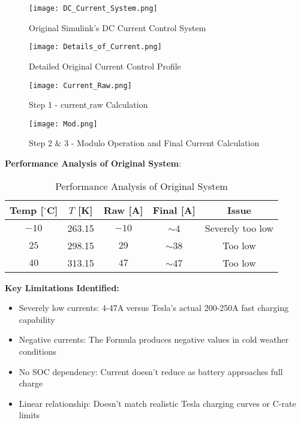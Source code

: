 \documentclass[conference]{IEEEtran}
\begin{document}
\begin{figure}[H]
    \centering
    \texttt{[image: DC\_Current\_System.png]}
    \caption{Original Simulink's DC Current Control System}
    \label{fig:placeholder}
\end{figure}

\begin{figure}[H]
    \centering
    \texttt{[image: Details\_of\_Current.png]}
    \caption{Detailed Original Current Control Profile}
    \label{fig:placeholder}
\end{figure}

\begin{figure}[H]
    \centering
    \texttt{[image: Current\_Raw.png]}
    \caption{Step 1 - current$\_$raw Calculation}
    \label{fig:placeholder}
\end{figure}

\begin{figure}[H]
    \centering
    \texttt{[image: Mod.png]}
    \caption{Step 2 $\&$ 3 - Modulo Operation and Final Current Calculation}
    \label{fig:placeholder}
\end{figure}

\textbf{Performance Analysis of Original System}:

\begin{table}[h]
\centering
\caption{Performance Analysis of Original System}
\scriptsize 
\setlength{\tabcolsep}{3pt} 
\renewcommand{\arraystretch}{1.1} 
\begin{tabular}{|c|c|c|c|c|}
\hline
\textbf{Temp [$^\circ$C]} & \textbf{$T$ [K]} & \textbf{Raw [A]} & \textbf{Final [A]} & \textbf{Issue} \\ \hline
$-10$ & 263.15 & $-10$ & $\sim$4 & Severely too low \\ \hline
$25$  & 298.15 & $29$  & $\sim$38 & Too low \\ \hline
$40$  & 313.15 & $47$  & $\sim$47 & Too low \\ \hline
\end{tabular}
\end{table}

\textbf{Key Limitations Identified:}

\begin{itemize}
    \item Severely low currents: 4-47A versus Tesla's actual 200-250A fast charging capability \cite{sawant} \cite{MASTOI202211504}
    \item Negative currents: The Formula produces negative values in cold weather conditions
    \item No SOC dependency: Current doesn't reduce as battery approaches full charge
    \item Linear relationship: Doesn't match realistic Tesla charging curves or C-rate limits
\end{itemize}
\end{document}
